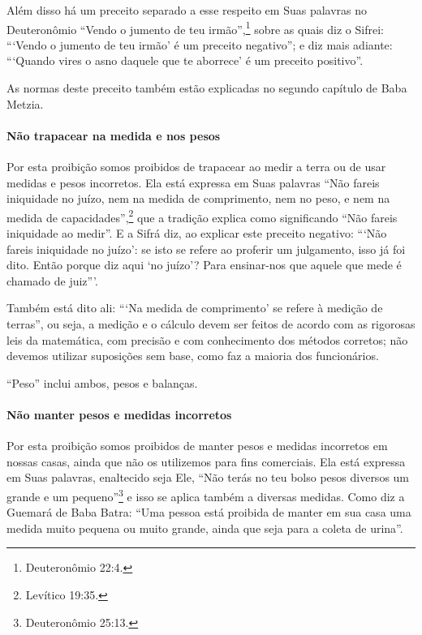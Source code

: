 Além disso há um preceito separado a esse respeito em Suas palavras no
Deuteronômio ``Vendo o jumento de teu irmão'',\footnote{Deuteronômio 22:4.} sobre
as quais diz o Sifrei: ```Vendo o jumento de teu irmão' é um preceito
negativo''; e diz mais adiante: ```Quando vires o asno daquele que te
aborrece' é um preceito positivo''.

As normas deste preceito também estão explicadas no segundo capítulo de
Baba Metzia.

\paragraph{Não trapacear na medida e nos pesos}

Por esta proibição somos proibidos de trapacear ao medir a terra ou de
usar medidas e pesos incorretos. Ela está expressa em Suas palavras
``Não fareis iniquidade no juízo, nem na medida de comprimento, nem no
peso, e nem na medida de capacidades'',\footnote{Levítico 19:35.} que a tradição
explica como significando ``Não fareis iniquidade ao medir''. E a Sifrá
diz, ao explicar este preceito negativo: ```Não fareis iniquidade no
juízo': se isto se refere ao proferir um julgamento, isso já foi dito.
Então porque diz aqui `no juízo'? Para ensinar-nos que aquele que mede é
chamado de juiz'''.

Também está dito ali: ```Na medida de comprimento' se refere à medição
de terras'', ou seja, a medição e o cálculo devem ser feitos de acordo
com as rigorosas leis da matemática, com precisão e com conhecimento dos
métodos corretos; não devemos utilizar suposições sem base, como faz a
maioria dos funcionários.

``Peso'' inclui ambos, pesos e balanças.

\paragraph{Não manter pesos e medidas incorretos}

Por esta proibição somos proibidos de manter pesos e medidas incorretos
em nossas casas, ainda que não os utilizemos para fins comerciais. Ela
está expressa em Suas palavras, enaltecido seja Ele, ``Não terás no teu
bolso pesos diversos um grande e um pequeno''\footnote{Deuteronômio 25:13.} e
isso se aplica também a diversas medidas. Como diz a Guemará de Baba
Batra: ``Uma pessoa está proibida de manter em sua casa uma medida muito
pequena ou muito grande, ainda que seja para a coleta de urina''.

